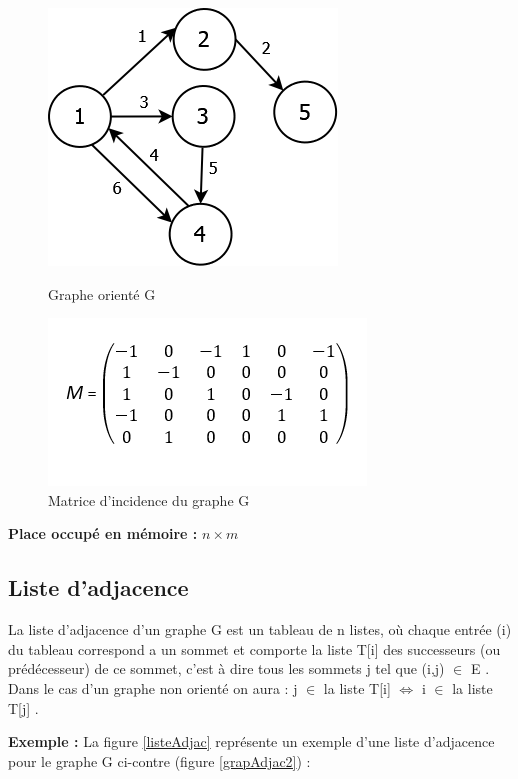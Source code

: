 \begin{figure}[H]
	\begin{minipage}[c]{.46\linewidth}
	\begin{center}
		\includegraphics[height=100 pt, width=110 pt]{./ressources/image/graphIncid.png} 
		\caption{Graphe orienté G}
		\label{grapIncid}
	\end{center}
	\end{minipage} 
	\begin{minipage}[c]{.46\linewidth}
	\begin{center}
		\includegraphics[height=110 pt, width=140 pt]{./ressources/image/matriceIncid.png} 
		\caption{Matrice d'incidence du graphe G}
		\label{matriceIncid}
	\end{center}
	\end{minipage} 
\end{figure}

\textbf{Place occupé en mémoire :} $n \times m$
		
		\subsection{Liste d'adjacence}
			La liste d'adjacence d'un graphe G est un tableau de n listes, où chaque entrée (i) du tableau correspond a un sommet et comporte la liste T[i] des successeurs (ou prédécesseur) de ce sommet, c'est à dire tous les sommets j tel que (i,j) $\in$ E \citep{mathieu}.\\
Dans le cas d'un graphe non orienté on aura : j $\in$ la liste T[i]  $\iff$ i $\in$ la liste T[j] \citep{IUTLyonInformatique}.

\textbf{Exemple :} La figure \ref{listeAdjac} représente 					un exemple d'une liste d'adjacence pour le graphe G ci-contre 			(figure \ref{grapAdjac2}) :
			
